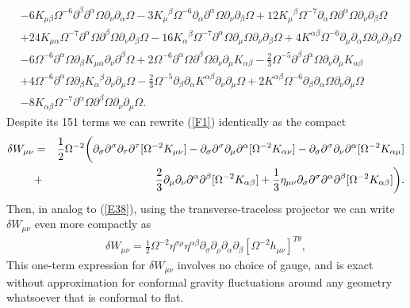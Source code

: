 \documentclass[aps]{revtex4}
\begin{document}
\begin{align}
\nonumber\\
&- 6 K_{\mu \beta} \Omega^{-6} \partial^{\beta}\partial^{\alpha}\Omega \partial_{\nu}\partial_{\alpha}\Omega - 3 K_{\mu}{}^{\beta} \Omega^{-6} \partial_{\alpha}\partial^{\alpha}\Omega \partial_{\nu}\partial_{\beta}\Omega + 12 K_{\mu}{}^{\beta} \Omega^{-7} \partial_{\alpha}\Omega \partial^{\alpha}\Omega \partial_{\nu}\partial_{\beta}\Omega 
\nonumber\\
&+ 24 K_{\mu \alpha} \Omega^{-7} \partial^{\alpha}\Omega \partial^{\beta}\Omega \partial_{\nu}\partial_{\beta}\Omega - 16 K_{\alpha}{}^{\beta} \Omega^{-7} \partial^{\alpha}\Omega \partial_{\mu}\Omega \partial_{\nu}\partial_{\beta}\Omega + 4 K^{\alpha \beta} \Omega^{-6} \partial_{\mu}\partial_{\alpha}\Omega \partial_{\nu}\partial_{\beta}\Omega 
\nonumber\\
&- 6 \Omega^{-6} \partial^{\alpha}\Omega \partial_{\beta}K_{\mu \alpha} \partial_{\nu}\partial^{\beta}\Omega + 2 \Omega^{-6} \partial^{\alpha}\Omega \partial^{\beta}\Omega \partial_{\nu}\partial_{\mu}K_{\alpha \beta} -  \tfrac{2}{3} \Omega^{-5} \partial^{\beta}\partial^{\alpha}\Omega \partial_{\nu}\partial_{\mu}K_{\alpha \beta} 
\nonumber\\
&+ 4 \Omega^{-6} \partial^{\alpha}\Omega \partial_{\beta}K_{\alpha}{}^{\beta} \partial_{\nu}\partial_{\mu}\Omega -  \tfrac{2}{3} \Omega^{-5} \partial_{\beta}\partial_{\alpha}K^{\alpha \beta} \partial_{\nu}\partial_{\mu}\Omega + 2 K^{\alpha \beta} \Omega^{-6} \partial_{\beta}\partial_{\alpha}\Omega \partial_{\nu}\partial_{\mu}\Omega
\nonumber\\
& - 8 K_{\alpha \beta} \Omega^{-7} \partial^{\alpha}\Omega \partial^{\beta}\Omega \partial_{\nu}\partial_{\mu}\Omega.
\label{F1}
\end{align}
%
Despite its 151 terms we can rewrite (\ref{F1}) identically as the compact
%
\begin{eqnarray}
\delta W_{\mu\nu}&=&\frac{1}{2}\Omega^{-2}\bigg{(}\partial_{\sigma}\partial^{\sigma}\partial_{\tau}\partial^{\tau}[\Omega^{-2}K_{\mu\nu}]
-\partial_{\sigma}\partial^{\sigma}\partial_{\mu}\partial^{\alpha}[\Omega^{-2}K_{\alpha\nu}]
-\partial_{\sigma}\partial^{\sigma}\partial_{\nu}\partial^{\alpha}[\Omega^{-2}K_{\alpha\mu}]
\nonumber\\
&+&\frac{2}{3}\partial_{\mu}\partial_{\nu}\partial^{\alpha}\partial^{\beta}[\Omega^{-2}K_{\alpha\beta}]+\frac{1}{3}\eta_{\mu\nu}\partial_{\sigma}\partial^{\sigma}\partial^{\alpha}\partial^{\beta}[\Omega^{-2}K_{\alpha\beta}]\bigg{)}.
\label{F2}
\end{eqnarray} 
%
Then, in analog to (\ref{E38}),  using the transverse-traceless projector we can write $\delta W_{\mu\nu}$ even more compactly as
%
\begin{eqnarray}
\delta W_{\mu\nu}=\frac{1}{2}\Omega^{-2}\eta^{\sigma\rho}\eta^{\alpha\beta}\partial_{\sigma}\partial_{\rho} \partial_{\alpha}\partial_{\beta}[\Omega^{-2}h_{\mu\nu}]^{T\theta},
\label{F3}
\end{eqnarray}
%
This one-term expression for $\delta W_{\mu\nu}$ involves no choice of gauge, and is exact without approximation for conformal gravity fluctuations around any geometry whatsoever that is conformal to flat.
\end{document}
